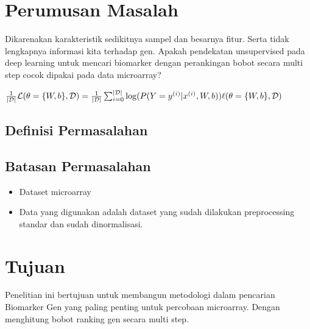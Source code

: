 \section{Perumusan Masalah}
Dikarenakan karakteristik sedikitnya sampel dan besarnya fitur. Serta tidak lengkapnya informasi kita terhadap gen. Apakah pendekatan unsupervised pada deep learning untuk mencari biomarker dengan perankingan bobot secara multi step cocok dipakai pada data microarray?

$ \frac{1}{|\mathcal{D}|} \mathcal{L} (\theta=\{W,b\}, \mathcal{D}) = \frac{1}{|\mathcal{D}|} \sum_{i=0}^{|\mathcal{D}|} \log(P(Y=y^{(i)}|x^{(i)}, W,b)) \\
\ell (\theta=\{W,b\}, \mathcal{D}) $


\subsection{Definisi Permasalahan}


\subsection{Batasan Permasalahan}
\begin{itemize}
\item Dataset microarray
\item Data yang digunakan adalah dataset yang sudah dilakukan preprocessing standar dan sudah dinormalisasi.
\end{itemize}

\section{Tujuan}
Penelitian ini bertujuan untuk membangun metodologi dalam pencarian Biomarker Gen yang paling penting untuk percobaan microarray. Dengan menghitung bobot ranking gen secara multi step.

